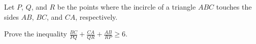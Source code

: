 Let $P$,  $Q$,  and $R$ be the points where the incircle of a triangle $ABC$ touches the sides $AB$,  $BC$,  and $CA$,  respectively.

Prove the inequality $\frac{BC} {PQ} + \frac{CA} {QR} + \frac{AB} {RP} \geq 6$.
